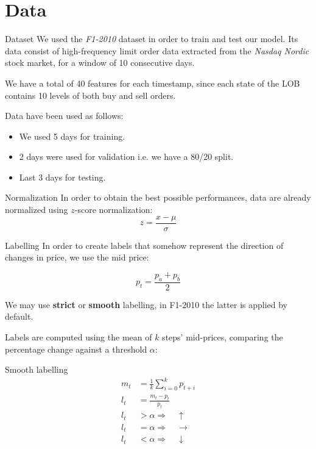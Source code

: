 \documentclass{beamer}
\begin{document}
\section{Data}
\begin{frame}{Dataset}
    We used the \textit{F1-2010} dataset in order to train and test our model.
    Its data consist of high-frequency limit order data extracted from the \textit{Nasdaq Nordic} stock market, for a window of 10 consecutive days.
\end{frame}

\begin{frame}
    We have a total of 40 features for each timestamp, since each state of the LOB contains 10 levels of both buy and sell orders.

    Data have been used as follows:
    \begin{itemize}
        \item We used 5 days for training.
        \item 2 days were used for validation i.e. we have a 80/20 split.
        \item Last 3 days for testing.
    \end{itemize}
\end{frame}

\begin{frame}{Normalization}
    In order to obtain the best possible performances, data are already normalized using $z$-score normalization:
    \begin{equation}
        z = \frac{x - \mu}{\sigma}
    \end{equation}
\end{frame}

\begin{frame}{Labelling}
    In order to create labels that somehow represent the direction of changes in price, we use the mid price:

    \begin{equation}
        p_t = \frac{p_a + p_b}{2}
    \end{equation}

    We may use \textbf{strict} or \textbf{smooth} labelling, in F1-2010 the latter is applied by default.

    Labels are computed using the mean of $k$ steps' mid-prices, comparing the percentage change against a threshold $\alpha$:
\end{frame}

\begin{frame}{Smooth labelling}
    \begin{align}
        m_t & = \frac{1}{k} \sum_{i=0}^k p_{t+i}     \\
        l_t & = \frac{m_t - p_t}{p_t}                \\
        l_t & > \alpha \Rightarrow \quad \uparrow    \\
        l_t & = \alpha \Rightarrow \quad \rightarrow \\
        l_t & < \alpha \Rightarrow \quad \downarrow
    \end{align}
\end{frame}
\end{document}
